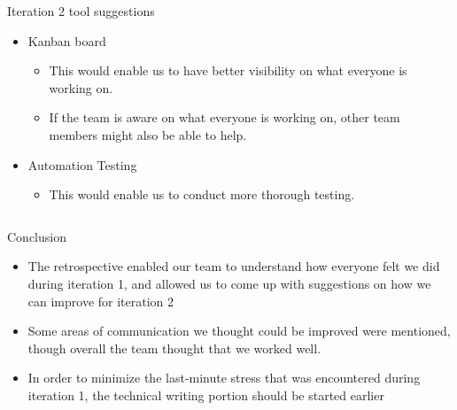 \documentclass[final,hyperref={pdfpagelabels=false}]{beamer}
\begin{document}
\begin{frame}[t]
\begin{columns}[t]
\begin{column}{.465\textwidth}

\begin{block}{Iteration 2 tool suggestions}
\begin{itemize}
\item Kanban board
    \begin{itemize}
        \item This would enable us to have better visibility on what everyone is working on.
        \item If the team is aware on what everyone is working on, other team members might also be able to help.
    \end{itemize}
\item Automation Testing
    \begin{itemize}
        \item This would enable us to conduct more thorough testing.
    \end{itemize}

\end{itemize}
\end{block}









\end{column} %

\begin{column}{.015\textwidth}\end{column} %

\end{columns} %





  
  
\begin{block}{Conclusion}
\begin{itemize}
\item The retrospective enabled our team to understand how everyone felt we did during iteration 1, and allowed us to come up with suggestions on how we can improve for iteration 2
\item Some areas of communication we thought could be improved were mentioned, though overall the team thought that we worked well. 
\item In order to minimize the last-minute stress that was encountered during iteration 1, the technical writing portion should be started earlier
\end{itemize}
\end{block}




\end{frame} %
\end{document}
